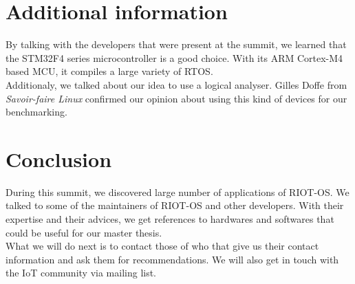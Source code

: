 \documentclass[journal, a4paper]{../IEEEtran}
\begin{document}

\section{Additional information}
By talking with the developers that were present at the summit, we learned that the STM32F4 series microcontroller is a good choice. 
With its ARM Cortex-M4 based MCU, it compiles a large variety of RTOS. \\

Additionaly, we talked about our idea to use a logical analyser. 
Gilles Doffe from \textit{Savoir-faire Linux} confirmed our opinion about using this kind of devices for our benchmarking.




\section{Conclusion}
During this summit, we discovered large number of applications of RIOT-OS.
We talked to some of the maintainers of RIOT-OS and other developers. 
With their expertise and their advices, we get references to hardwares and softwares that could be useful for our master thesis. \\

What we will do next is to contact those of who that give us their contact information and ask them for recommendations. We will also get in touch with the IoT community via mailing list. 
\end{document}
